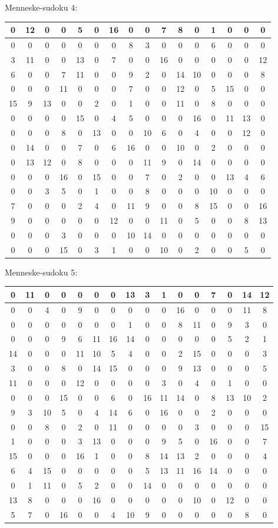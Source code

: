 \documentclass[]{report}
\begin{document}
Menneske-sudoku 4:
\begin{tabular}{|c|c|c|c||c|c|c|c||c|c|c|c||c|c|c|c}
\hline
0&12&0&0&5&0&16&0&0&7&8&0&1&0&0&0\\\hline
0&0&0&0&0&0&0&8&3&0&0&0&6&0&0&0\\\hline
3&11&0&0&13&0&7&0&0&16&0&0&0&0&0&12\\\hline
6&0&0&7&11&0&0&9&2&0&14&10&0&0&0&8\\\hline\hline
0&0&0&11&0&0&0&7&0&0&12&0&5&15&0&0\\\hline
15&9&13&0&0&2&0&1&0&0&11&0&8&0&0&0\\\hline
0&0&0&0&15&0&4&5&0&0&0&16&0&11&13&0\\\hline
0&0&0&8&0&13&0&0&10&6&0&4&0&0&12&0\\\hline\hline
0&14&0&0&7&0&6&16&0&0&10&0&2&0&0&0\\\hline
0&13&12&0&8&0&0&0&11&9&0&14&0&0&0&0\\\hline
0&0&0&16&0&15&0&0&7&0&2&0&0&13&4&6\\\hline
0&0&3&5&0&1&0&0&8&0&0&0&10&0&0&0\\\hline\hline
7&0&0&0&2&4&0&11&9&0&0&8&15&0&0&16\\\hline
9&0&0&0&0&0&12&0&0&11&0&5&0&0&8&13\\\hline
0&0&0&3&0&0&0&10&14&0&0&0&0&0&0&0\\\hline
0&0&0&15&0&3&1&0&0&10&0&2&0&0&5&0\\\hline
\end{tabular}
Menneske-sudoku 5:
\begin{tabular}{|c|c|c|c||c|c|c|c||c|c|c|c||c|c|c|c}
\hline
0&11&0&0&0&0&0&13&3&1&0&0&7&0&14&12\\\hline
0&0&4&0&9&0&0&0&0&0&16&0&0&0&11&8\\\hline
0&0&0&0&0&0&0&1&0&0&8&11&0&9&3&0\\\hline
0&0&0&9&6&11&16&14&0&0&0&0&0&5&2&1\\\hline\hline
14&0&0&0&11&10&5&4&0&0&2&15&0&0&0&3\\\hline
3&0&0&8&0&14&15&0&0&0&9&13&0&0&0&5\\\hline
11&0&0&0&12&0&0&0&0&3&0&4&0&1&0&0\\\hline
0&0&0&15&0&0&6&0&16&11&14&0&8&13&10&2\\\hline\hline
9&3&10&5&0&4&14&6&0&16&0&0&2&0&0&0\\\hline
0&0&8&0&2&0&11&0&0&0&0&3&0&0&0&15\\\hline
1&0&0&0&3&13&0&0&0&9&5&0&16&0&0&7\\\hline
15&0&0&0&16&1&0&0&8&14&13&2&0&0&0&4\\\hline\hline
6&4&15&0&0&0&0&0&5&13&11&16&14&0&0&0\\\hline
0&1&11&0&5&2&0&0&14&0&0&0&0&0&0&0\\\hline
13&8&0&0&0&16&0&0&0&0&0&10&0&12&0&0\\\hline
5&7&0&16&0&0&4&10&9&0&0&0&0&0&8&0\\\hline
\end{tabular}
\end{document}
